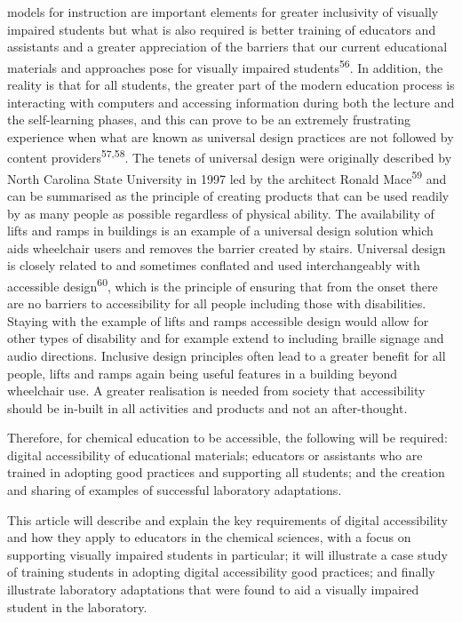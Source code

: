 \documentclass[11.5pt]{sig-alternate} %
\begin{document}
\begin{large}
models for instruction are important elements for greater inclusivity of visually impaired students but what is also required is better training of educators and assistants and a greater appreciation of the barriers that our current educational materials and approaches pose for visually impaired students\textsuperscript{56}. In addition, the reality is that for all students, the greater part of the modern education process is interacting with computers and accessing information during both the lecture and the self-learning phases, and this can prove to be an extremely frustrating experience when what are known as universal design practices are not followed by content providers\textsuperscript{57,58}. The tenets of universal design were originally described by North Carolina State University in 1997 led by the architect Ronald Mace\textsuperscript{59} and can be summarised as the principle of creating products that can be used readily by as many people as possible regardless of physical ability. The availability of lifts and ramps in buildings is an example of a universal design solution which aids wheelchair users and removes the barrier created by stairs. Universal design is closely related to and sometimes conflated and used interchangeably with accessible design\textsuperscript{60},  which is the principle of ensuring that from the onset there are no barriers to accessibility for all people including those with disabilities. Staying with the example of lifts and ramps accessible design would allow for other types of disability and for example extend to including braille signage and audio directions. Inclusive design principles often lead to a greater benefit for all people, lifts and ramps again being useful features in a building beyond wheelchair use.  A greater realisation is needed from society that accessibility should be in-built in all activities and products and not an after-thought.

Therefore, for chemical education to be accessible, the following will be required: digital accessibility of educational materials; educators or assistants who are trained in adopting good practices and supporting all students; and the creation and sharing of examples of successful laboratory adaptations. 

This article will describe and explain the key requirements of digital accessibility and how they apply to educators in the chemical sciences, with a focus on supporting visually impaired students in particular; it will illustrate a case study of training students in adopting digital accessibility good practices; and finally illustrate laboratory adaptations that were found to aid a visually impaired student in the laboratory. 


\end{large}
\end{document}
